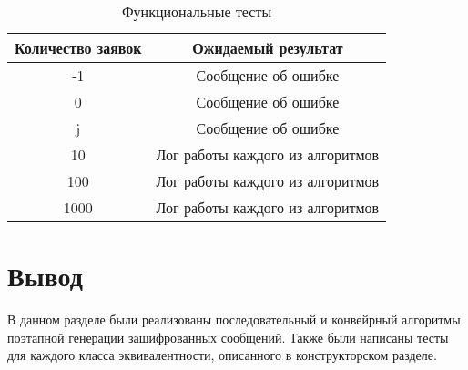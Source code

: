 \begin{table}[h!]
	\begin{center}
    \begin{threeparttable}
        \captionsetup{justification=raggedright,singlelinecheck=off}
        \caption{\label{tab:tests}Функциональные тесты}
        \begin{tabular}{|c|c|}
			\hline
            \textbf{Количество заявок} & \textbf{Ожидаемый результат} \\ [2mm]
            \hline
            -1
            &
            Сообщение об ошибке
            \\
            \hline
            0
            &
            Сообщение об ошибке
            \\
            \hline
            j
            &
            Сообщение об ошибке
            \\
            \hline
            10
            &
            Лог работы каждого из алгоритмов
            \\
            \hline
            100
            &
            Лог работы каждого из алгоритмов
            \\
            \hline
            1000
            &
            Лог работы каждого из алгоритмов
            \\
            \hline
		\end{tabular}
    \end{threeparttable} 
	\end{center}
\end{table}

\section{Вывод}

В данном разделе были реализованы последовательный и конвейрный алгоритмы
поэтапной генерации зашифрованных сообщений. Также были написаны
тесты для каждого класса эквивалентности, описанного в конструкторском разделе.
